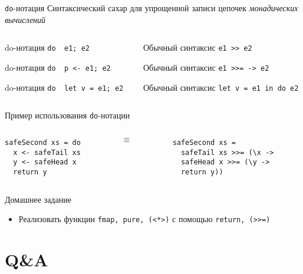 \documentclass{beamer}
\newcommand{\hs}[1]{\texttt{#1}}
\begin{document}
  \begin{frame}{\texttt{do}-нотация}
      Синтаксический сахар для упрощенной записи цепочек \textit{монадических вычислений}
\begin{columns}
\begin{column}{0.5\textwidth}
\begin{block}{do-нотация}
\hs{do { e1; e2 }} 
\end{block}
\begin{block}{do-нотация}
\hs{do { p <- e1; e2 }}
\end{block}
\begin{block}{do-нотация}
\hs{do { let v = e1; e2 }} 
\end{block}
\end{column}
\begin{column}{0.5\textwidth}
\begin{block}{Обычный синтаксис}
\hs{e1 >> e2}
\end{block}
\begin{block}{Обычный синтаксис}
\hs{e1 >>= \p -> e2}
\end{block}
\begin{block}{Обычный синтаксис}
\hs{let v = e1 in do e2}
\end{block}
\end{column}
\end{columns}
  \end{frame}
  \begin{frame}[fragile]{Пример использования \texttt{do}-нотации}
\begin{columns}
\begin{column}{0.475\textwidth}
  \begin{verbatim}
safeSecond xs = do
  x <- safeTail xs
  y <- safeHead x
  return y
\end{verbatim}
\end{column}
\begin{column}{0.05\textwidth}
  $\equiv$
\end{column}
\begin{column}{0.475\textwidth}
  \begin{verbatim}
safeSecond xs = 
  safeTail xs >>= (\x ->
  safeHead x >>= (\y ->
  return y))
\end{verbatim}
\end{column}
\end{columns}
  \end{frame}
\begin{frame}{Домашнее задание}
    \begin{itemize}
        \item Реализовать функции \hs{fmap, pure, (<*>)} с помощью \hs{return, (>>=)}
    \end{itemize}
\end{frame}
  \section{Q\&A}
\end{document}

